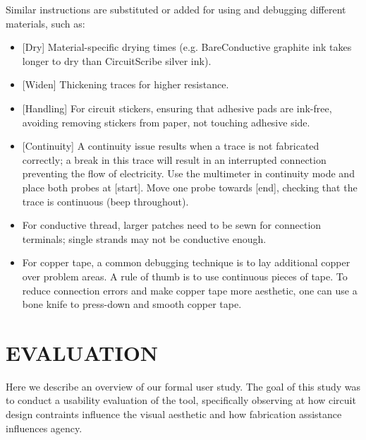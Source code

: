 \documentclass{sigchi}
\begin{document}
        Similar instructions are substituted or added for using and debugging different materials, such as:
        \begin{itemize}   
          \item {[}Dry{]} Material-specific drying times (e.g. BareConductive graphite ink takes longer to dry than CircuitScribe silver ink). 
          \item {[}Widen{]} Thickening traces for higher resistance. 
          \item {[}Handling{]} For circuit stickers, ensuring that adhesive pads are ink-free, avoiding removing stickers from paper, not touching adhesive side. %
          \item {[}Continuity{]} A continuity issue results when a trace is not fabricated correctly; a break in this trace will result in an interrupted connection preventing the flow of electricity. Use the multimeter in continuity mode and place both probes at [start]. Move one probe towards [end], checking that the trace is continuous (beep throughout).  
          \item For conductive thread, larger patches need to be sewn for connection terminals; single strands may not be conductive enough. 
          \item For copper tape, a common debugging technique is to lay additional copper over problem areas. A rule of thumb is to use continuous pieces of tape. To reduce connection errors and make copper tape more aesthetic, one can use a bone knife to press-down and smooth copper tape. 
        \end{itemize}

\section{EVALUATION}
    Here we describe an overview of our formal user study. The goal of this study was to conduct a usability evaluation of the tool, specifically observing at how circuit design contraints influence the visual aesthetic and how fabrication assistance influences agency. 
\end{document}
